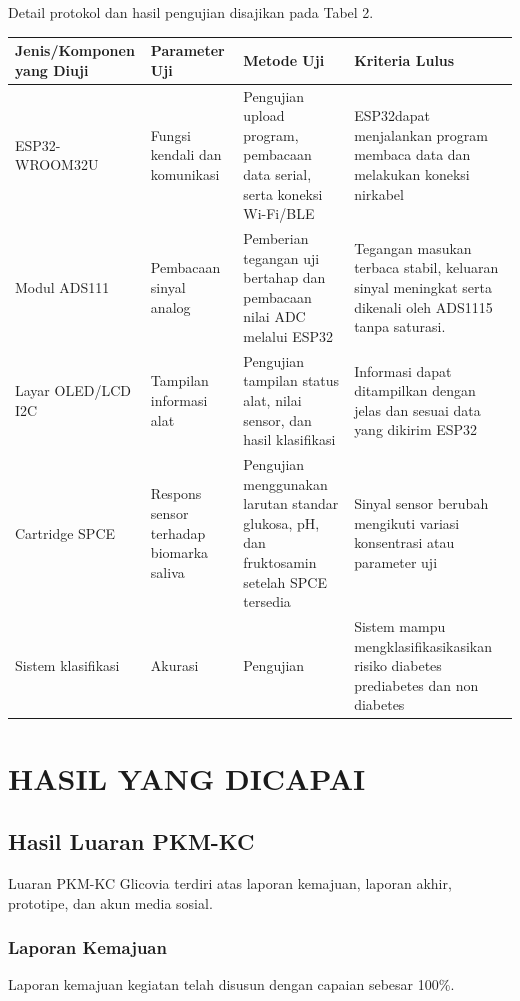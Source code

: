 \documentclass[a4paper,12pt]{article}
\begin{document}
Detail protokol dan hasil pengujian disajikan pada Tabel 2.

\begin{longtable}{|p{}|p{}|p{}|p{}|}
\hline
Jenis/Komponen yang Diuji & Parameter Uji & Metode Uji & Kriteria Lulus \\
\hline
ESP32-WROOM32U & Fungsi kendali dan komunikasi & Pengujian upload program, pembacaan data serial, serta koneksi Wi-Fi/BLE & ESP32dapat menjalankan program membaca data dan melakukan koneksi nirkabel \\
\hline
Modul ADS111 & Pembacaan sinyal analog & Pemberian tegangan uji bertahap dan pembacaan nilai ADC melalui ESP32 & Tegangan masukan terbaca stabil, keluaran sinyal meningkat serta dikenali oleh ADS1115 tanpa saturasi. \\
\hline
Layar OLED/LCD I2C & Tampilan informasi alat & Pengujian tampilan status alat, nilai sensor, dan hasil klasifikasi & Informasi dapat ditampilkan dengan jelas dan sesuai data yang dikirim ESP32 \\
\hline
Cartridge SPCE & Respons sensor terhadap biomarka saliva & Pengujian menggunakan larutan standar glukosa, pH, dan fruktosamin setelah SPCE tersedia & Sinyal sensor berubah mengikuti variasi konsentrasi atau parameter uji \\
\hline
Sistem klasifikasi & Akurasi & Pengujian & Sistem mampu mengklasifikasikasikan risiko diabetes prediabetes dan non diabetes \\
\hline
\end{longtable}

\section{HASIL YANG DICAPAI}

\subsection{Hasil Luaran PKM-KC}

Luaran PKM-KC Glicovia terdiri atas laporan kemajuan, laporan akhir, prototipe, dan akun media sosial.

\subsubsection{Laporan Kemajuan}

  Laporan kemajuan kegiatan telah disusun dengan capaian sebesar 100\%.
\end{document}
